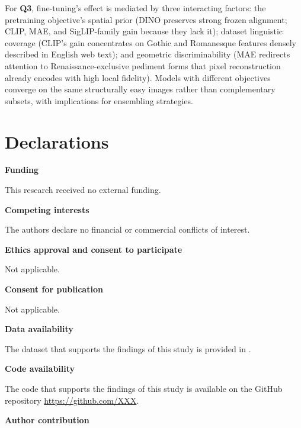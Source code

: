 \documentclass[lineno,pdflatex,sn-mathphys-num]{sn-jnl}%
\theoremstyle{thmstyleone}%
\theoremstyle{thmstyletwo}%
\theoremstyle{thmstylethree}%
\begin{document}
For \textbf{Q3}, fine-tuning's effect is mediated by three interacting factors: the pretraining objective's spatial prior (DINO preserves strong frozen alignment; CLIP, MAE, and SigLIP-family gain because they lack it); dataset linguistic coverage (CLIP's gain concentrates on Gothic and Romanesque features densely described in English web text); and geometric discriminability (MAE redirects attention to Renaissance-exclusive pediment forms that pixel reconstruction already encodes with high local fidelity). Models with different objectives converge on the same structurally easy images rather than complementary subsets, with implications for ensembling strategies.






\cite{*}

\backmatter


\section*{Declarations}

\textbf{Funding}

This research received no external funding. \newline

\noindent\textbf{Competing interests}

The authors declare no financial or commercial conflicts of interest. \newline

\noindent\textbf{Ethics approval and consent to participate}

Not applicable.\newline

\noindent\textbf{Consent for publication}

Not applicable.\newline

\noindent\textbf{Data availability }

The dataset that supports the findings of this study is provided in \cite{Barz21WikiChurches}. \newline

\noindent\textbf{Code availability }

The code that supports the findings of this study is available on the GitHub repository \url{https://github.com/XXX}.\newline

\noindent\textbf{Author contribution}

\end{document}
